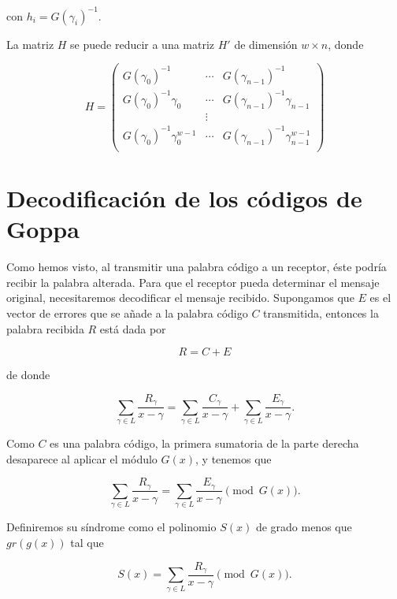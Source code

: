 con $h_i = G(\gamma_i)^{-1}$.

\begin{proposition}
    La matriz $H$ se puede reducir a una matriz $H'$ de dimensión $w \times n$, donde 

    \begin{equation}
        H = \left(
            \begin{array}{ccc} 
                G(\gamma_0)^{-1} & \cdots & G(\gamma_{n-1})^{-1}  \\
                G(\gamma_0)^{-1} \gamma_0 & \cdots & G(\gamma_{n-1})^{-1} \gamma_{n-1} \\
                & \vdots & \\
                G(\gamma_0)^{-1} \gamma_0^{w-1} & \cdots & G(\gamma_{n-1})^{-1} \gamma_{n-1}^{w-1} \\
            \end{array}
            \right)
    \end{equation}
\end{proposition}

\section{Decodificación de los códigos de Goppa}

Como hemos visto, al transmitir una palabra código a un receptor, éste podría recibir la palabra alterada. Para que el receptor pueda determinar el mensaje original, necesitaremos decodificar el mensaje recibido. Supongamos que $E$ es el vector de errores que se añade a la palabra código $C$ transmitida, entonces la palabra recibida $R$ está dada por

$$R = C + E$$

de donde 

$$\sum_{\gamma \in L} \frac{R_\gamma}{x - \gamma} = \sum_{\gamma \in L} \frac{C_\gamma}{x - \gamma} + \sum_{\gamma \in L} \frac{E_\gamma}{x - \gamma}.$$

Como $C$ es una palabra código, la primera sumatoria de la parte derecha desaparece al aplicar el módulo $G(x)$, y tenemos que

$$\sum_{\gamma \in L} \frac{R_\gamma}{x - \gamma} = \sum_{\gamma \in L} \frac{E_\gamma}{x - \gamma} \pmod{G(x)}.$$

Definiremos su síndrome como el polinomio $S(x)$ de grado menos que $gr(g(x))$ tal que 

$$S(x) = \sum_{\gamma \in L} \frac{R_\gamma}{x - \gamma} \pmod{G(x)}.$$

